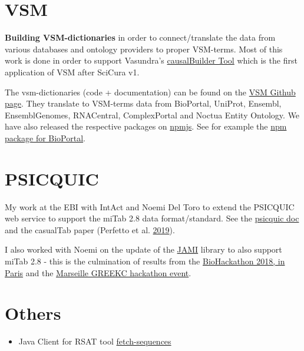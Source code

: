 \documentclass[
  12pt,
]{book}
\providecommand{\tightlist}{%
  \setlength{\itemsep}{0pt}\setlength{\parskip}{0pt}}
\begin{document}
\hypertarget{vsm-dict}{%
\section{VSM}\label{vsm-dict}}

\textbf{Building VSM-dictionaries} in order to connect/translate the data from various databases and ontology providers to proper VSM-terms.
Most of this work is done in order to support Vasundra's \href{https://vtoure.github.io/causalBuilder/}{causalBuilder Tool} which is the first application of VSM after SciCura v1.

The vsm-dictionaries (code + documentation) can be found on the \href{https://github.com/vsmjs}{VSM Github page}.
They translate to VSM-terms data from BioPortal, UniProt, Ensembl, EnsemblGenomes, RNACentral, ComplexPortal and Noctua Entity Ontology.
We have also released the respective packages on \href{https://www.npmjs.com/}{npmjs}.
See for example the \href{https://www.npmjs.com/package/vsm-dictionary-bioportal}{npm package for BioPortal}.

\hypertarget{psicquic}{%
\section{PSICQUIC}\label{psicquic}}

My work at the EBI with IntAct and Noemi Del Toro to extend the PSICQUIC web service to support the
miTab 2.8 data format/standard. See the \href{http://psicquic.github.io/MITAB28Format.html}{psicquic doc} and the casualTab paper (Perfetto et al. \protect\hyperlink{ref-Perfetto2019}{2019}).

I also worked with Noemi on the update of the \href{https://github.com/MICommunity/psi-jami}{JAMI}
library to also support miTab 2.8 - this is the culmination of results from the
\href{https://2018.biohackathon-europe.org/}{BioHackathon 2018, in Paris} and the
\href{https://github.com/GREEKC/hackathon-marseille/tree/master/project_descriptions/causal_psicquic}{Marseille GREEKC hackathon event}.

\hypertarget{others}{%
\section{Others}\label{others}}

\begin{itemize}
\tightlist
\item
  Java Client for RSAT tool \href{https://github.com/bblodfon/rsat-rest-java-clients}{fetch-sequences}
\end{itemize}
\end{document}
